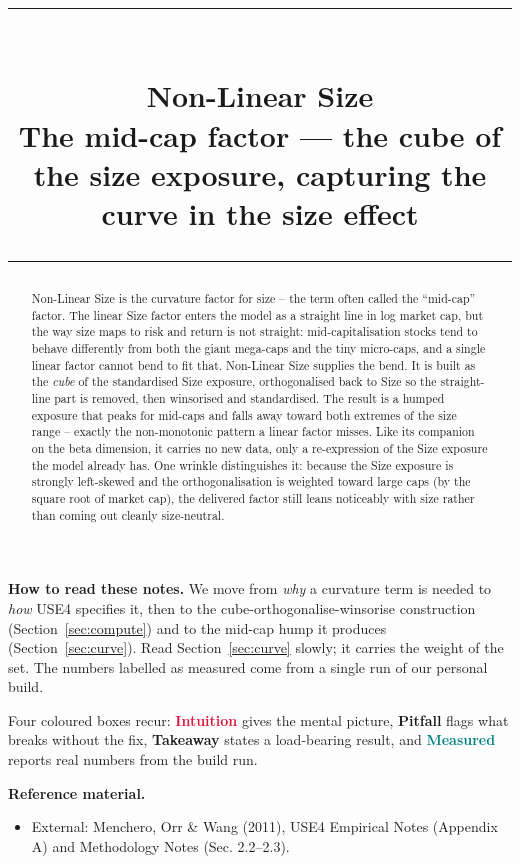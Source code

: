 \documentclass[11pt]{article}
\title{\vspace{-2.2em}
  {\color{steel}\rule{\textwidth}{1.3pt}}\\[0.7em]
  \Huge\bfseries Non-Linear Size\\[0.35em]
  \large\mdseries The mid-cap factor --- the cube of the size exposure, capturing the curve in the size effect\\[0.4em]
  {\color{steel}\rule{\textwidth}{0.7pt}}}
\author{}
\date{}
\theoremstyle{definition}
\theoremstyle{plain}
\theoremstyle{remark}
\begin{document}
\maketitle
\thispagestyle{empty}

\begin{abstract}
Non-Linear Size is the curvature factor for size -- the term often called the ``mid-cap'' factor. The linear Size factor enters the model as a straight line in log market cap, but the way size maps to risk and return is not straight: mid-capitalisation stocks tend to behave differently from both the giant mega-caps and the tiny micro-caps, and a single linear factor cannot bend to fit that. Non-Linear Size supplies the bend. It is built as the \emph{cube} of the standardised Size exposure, orthogonalised back to Size so the straight-line part is removed, then winsorised and standardised. The result is a humped exposure that peaks for mid-caps and falls away toward both extremes of the size range -- exactly the non-monotonic pattern a linear factor misses. Like its companion on the beta dimension, it carries no new data, only a re-expression of the Size exposure the model already has. One wrinkle distinguishes it: because the Size exposure is strongly left-skewed and the orthogonalisation is weighted toward large caps (by the square root of market cap), the delivered factor still leans noticeably with size rather than coming out cleanly size-neutral.
\end{abstract}

\begin{tcolorbox}[colback=paperlt,colframe=ink!30,boxrule=0.4pt,arc=2pt,left=10pt,right=10pt,top=8pt,bottom=8pt]
\textbf{How to read these notes.} We move from \emph{why} a curvature term is needed to \emph{how} USE4 specifies it, then to the cube-orthogonalise-winsorise construction (Section~\ref{sec:compute}) and to the mid-cap hump it produces (Section~\ref{sec:curve}). Read Section~\ref{sec:curve} slowly; it carries the weight of the set. The numbers labelled as measured come from a single run of our personal build.

\smallskip
Four coloured boxes recur: \textcolor{crimson}{\textbf{Intuition}} gives the mental picture, \textcolor{amber}{\textbf{Pitfall}} flags what breaks without the fix, \textcolor{steel}{\textbf{Takeaway}} states a load-bearing result, and \textcolor{teal}{\textbf{Measured}} reports real numbers from the build run.

\smallskip
\textbf{Reference material.}
\begin{itemize}[leftmargin=1.4em,topsep=2pt]
  \item External: Menchero, Orr \& Wang (2011), USE4 Empirical Notes (Appendix A) and Methodology Notes (Sec. 2.2--2.3).
\end{itemize}
\end{tcolorbox}
\end{document}
